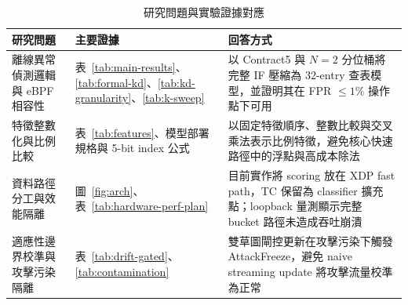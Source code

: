 \documentclass[12pt, a4paper, fontset=none]{ctexart}
\begin{document}
\begin{table}[H]
  \centering
  \caption{研究問題與實驗證據對應}
  \label{tab:rq-evidence}
  \small
  \renewcommand{\arraystretch}{1.2}
  \begin{tabularx}{\textwidth}{p{} p{} X}
    \toprule
    \textbf{研究問題} & \textbf{主要證據} & \textbf{回答方式} \\
    \midrule
    離線異常偵測邏輯與 eBPF 相容性 & 表~\ref{tab:main-results}、\ref{tab:formal-kd}、\ref{tab:kd-granularity}、\ref{tab:k-sweep} & 以 Contract5 與 $N=2$ 分位桶將完整 IF 壓縮為 32-entry 查表模型，並證明其在 FPR $\leq 1\%$ 操作點下可用 \\
    特徵整數化與比例比較 & 表~\ref{tab:features}、模型部署規格與 5-bit index 公式 & 以固定特徵順序、整數比較與交叉乘法表示比例特徵，避免核心快速路徑中的浮點與高成本除法 \\
    資料路徑分工與效能隔離 & 圖~\ref{fig:arch}、表~\ref{tab:hardware-perf-plan} & 目前實作將 scoring 放在 XDP fast path，TC 保留為 classifier 擴充點；loopback 量測顯示完整 bucket 路徑未造成吞吐崩潰 \\
    適應性邊界校準與攻擊污染隔離 & 表~\ref{tab:drift-gated}、\ref{tab:contamination} & 雙草圖閘控更新在攻擊污染下觸發 AttackFreeze，避免 naive streaming update 將攻擊流量校準為正常 \\
    \bottomrule
  \end{tabularx}
\end{table}
\end{document}
